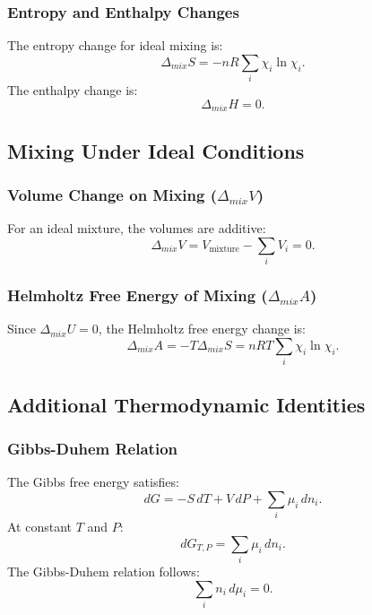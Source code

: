 \documentclass{article}
\theoremstyle{definition}
\begin{document}
\subsubsection{Entropy and Enthalpy Changes}
The entropy change for ideal mixing is:
\begin{equation}
\Delta_{mix} S = -nR\sum_i \chi_i\ln{\chi_i}.
\end{equation}
The enthalpy change is:
\begin{equation}
\Delta_{mix} H = 0.
\end{equation}

\subsection{Mixing Under Ideal Conditions}

\subsubsection{Volume Change on Mixing (\(\Delta_{mix}V\))}
For an ideal mixture, the volumes are additive:
\begin{equation}
\Delta_{mix} V = V_{\text{mixture}} - \sum_i V_i = 0.
\end{equation}

\subsubsection{Helmholtz Free Energy of Mixing (\(\Delta_{mix}A\))}
Since \(\Delta_{mix} U = 0\), the Helmholtz free energy change is:
\begin{equation}
\Delta_{mix} A = -T\Delta_{mix} S = nRT\sum_i \chi_i\ln{\chi_i}.
\end{equation}

\subsection{Additional Thermodynamic Identities}

\subsubsection{Gibbs-Duhem Relation}
The Gibbs free energy satisfies:
\begin{equation}
dG = -S\,dT + V\,dP + \sum_i \mu_i\,dn_i.
\end{equation}
At constant \(T\) and \(P\):
\begin{equation}
dG_{T,P} = \sum_i \mu_i\,dn_i.
\end{equation}
The Gibbs-Duhem relation follows:
\begin{equation}
\sum_i n_i\,d\mu_i = 0.
\end{equation}
\end{document}
